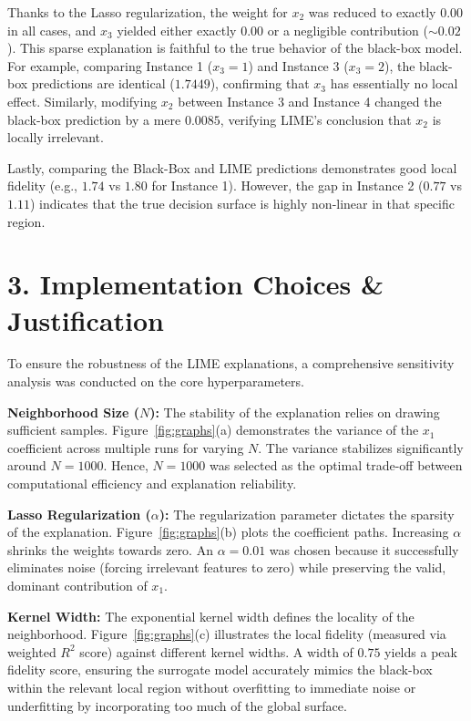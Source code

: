 \documentclass[fleqn,moreauthors,10pt]{ds_report}
\begin{document}
Thanks to the Lasso regularization, the weight for $x_2$ was reduced to exactly $0.00$ in all cases, and $x_3$ yielded either exactly $0.00$ or a negligible contribution ($\sim 0.02$). This sparse explanation is faithful to the true behavior of the black-box model. For example, comparing Instance 1 ($x_3=1$) and Instance 3 ($x_3=2$), the black-box predictions are identical ($1.7449$), confirming that $x_3$ has essentially no local effect. Similarly, modifying $x_2$ between Instance 3 and Instance 4 changed the black-box prediction by a mere $0.0085$, verifying LIME's conclusion that $x_2$ is locally irrelevant. 

Lastly, comparing the Black-Box and LIME predictions demonstrates good local fidelity (e.g., $1.74$ vs $1.80$ for Instance 1). However, the gap in Instance 2 ($0.77$ vs $1.11$) indicates that the true decision surface is highly non-linear in that specific region.


\section*{3. Implementation Choices \& Justification}
To ensure the robustness of the LIME explanations, a comprehensive sensitivity analysis was conducted on the core hyperparameters.

\textbf{Neighborhood Size ($N$):} The stability of the explanation relies on drawing sufficient samples. Figure~\ref{fig:graphs}(a) demonstrates the variance of the $x_1$ coefficient across multiple runs for varying $N$. The variance stabilizes significantly around $N=1000$. Hence, $N=1000$ was selected as the optimal trade-off between computational efficiency and explanation reliability.

\textbf{Lasso Regularization ($\alpha$):} The regularization parameter dictates the sparsity of the explanation. Figure~\ref{fig:graphs}(b) plots the coefficient paths. Increasing $\alpha$ shrinks the weights towards zero. An $\alpha=0.01$ was chosen because it successfully eliminates noise (forcing irrelevant features to zero) while preserving the valid, dominant contribution of $x_1$.

\textbf{Kernel Width:} The exponential kernel width defines the locality of the neighborhood. Figure~\ref{fig:graphs}(c) illustrates the local fidelity (measured via weighted $R^2$ score) against different kernel widths. A width of $0.75$ yields a peak fidelity score, ensuring the surrogate model accurately mimics the black-box within the relevant local region without overfitting to immediate noise or underfitting by incorporating too much of the global surface.
\end{document}
